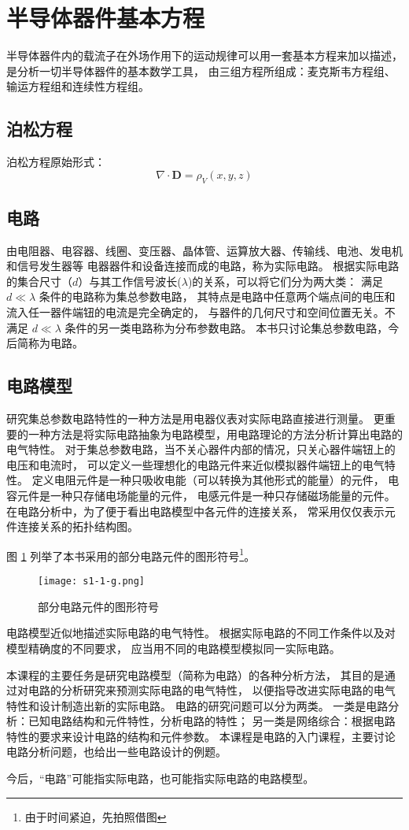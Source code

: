 \section{半导体器件基本方程}

半导体器件内的载流子在外场作用下的运动规律可以用一套基本方程来加以描述，
是分析一切半导体器件的基本数学工具，
由三组方程所组成：麦克斯韦方程组、输运方程组和连续性方程组。

\subsection{泊松方程}
泊松方程原始形式：
\[
    \nabla \cdot \boldsymbol{D} = \rho_V(x,y,z)
\]

\subsection{电路}
由电阻器、电容器、线圈、变压器、晶体管、运算放大器、传输线、电池、发电机和信号发生器等
电器器件和设备连接而成的电路，称为实际电路。
根据实际电路的集合尺寸（$d$）与其工作信号波长($\lambda$)的关系，可以将它们分为两大类：
满足 $d\ll\lambda$ 条件的电路称为集总参数电路，
其特点是电路中任意两个端点间的电压和流入任一器件端钮的电流是完全确定的，
与器件的几何尺寸和空间位置无关。不满足 $d\ll\lambda$ 条件的另一类电路称为分布参数电路。
本书只讨论集总参数电路，今后简称为电路。

\subsection{电路模型}
研究集总参数电路特性的一种方法是用电器仪表对实际电路直接进行测量。
更重要的一种方法是将实际电路抽象为电路模型，用电路理论的方法分析计算出电路的电气特性。
对于集总参数电路，当不关心器件内部的情况，只关心器件端钮上的电压和电流时，
可以定义一些理想化的电路元件来近似模拟器件端钮上的电气特性。
定义电阻元件是一种只吸收电能（可以转换为其他形式的能量）的元件，
电容元件是一种只存储电场能量的元件，
电感元件是一种只存储磁场能量的元件。
在电路分析中，为了便于看出电路模型中各元件的连接关系，
常采用仅仅表示元件连接关系的拓扑结构图。

图 \ref{fig:fig1_1_1} 列举了本书采用的部分电路元件的图形符号\footnote{由于时间紧迫，先拍照借图}。

\begin{figure}[htbp]
\centering
\texttt{[image: s1-1-g.png]}
\caption{部分电路元件的图形符号}\label{fig:fig1_1_1}
\end{figure}

电路模型近似地描述实际电路的电气特性。
根据实际电路的不同工作条件以及对模型精确度的不同要求，
应当用不同的电路模型模拟同一实际电路。

本课程的主要任务是研究电路模型（简称为电路）的各种分析方法，
其目的是通过对电路的分析研究来预测实际电路的电气特性，
以便指导改进实际电路的电气特性和设计制造出新的实际电路。
电路的研究问题可以分为两类。
一类是电路分析：已知电路结构和元件特性，分析电路的特性；
另一类是网络综合：根据电路特性的要求来设计电路的结构和元件参数。
本课程是电路的入门课程，主要讨论电路分析问题，也给出一些电路设计的例题。

今后，“电路”可能指实际电路，也可能指实际电路的电路模型。
